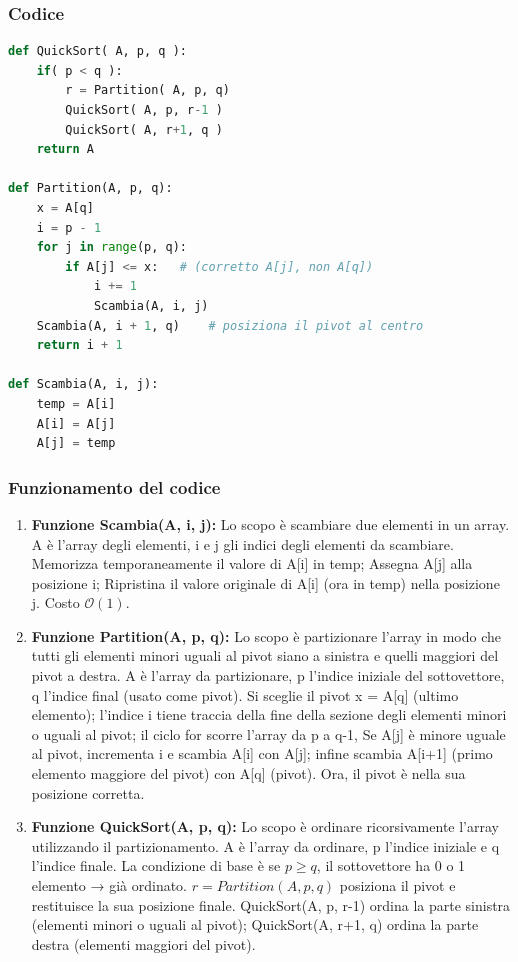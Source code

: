 \documentclass[a4paper, 11pt]{article}
\begin{document}
\subsubsection{Codice}
\begin{lstlisting}[style=mycodestyle, language=Python]
def QuickSort( A, p, q ):
    if( p < q ):
        r = Partition( A, p, q)
        QuickSort( A, p, r-1 )
        QuickSort( A, r+1, q )
    return A

def Partition(A, p, q):
    x = A[q]
    i = p - 1
    for j in range(p, q):
        if A[j] <= x:   # (corretto A[j], non A[q])
            i += 1
            Scambia(A, i, j)
    Scambia(A, i + 1, q)    # posiziona il pivot al centro
    return i + 1

def Scambia(A, i, j):
    temp = A[i]
    A[i] = A[j]
    A[j] = temp
\end{lstlisting}

\subsubsection*{Funzionamento del codice}

\begin{enumerate}
  \item \textbf{Funzione Scambia(A, i, j):} Lo scopo è scambiare due elementi in un array. A è l'array degli elementi,
   i e j gli indici degli elementi da scambiare. Memorizza temporaneamente il valore di A[i] 
   in temp; Assegna A[j] alla posizione i; Ripristina il valore originale di A[i] (ora in temp)
   nella posizione j. Costo $\mathcal{O}(1)$.

  \item \textbf{Funzione Partition(A, p, q):} Lo scopo è partizionare l'array in modo che tutti gli elementi 
   minori uguali al pivot siano a sinistra e quelli maggiori del pivot a destra. A è l'array da partizionare,
   p l'indice iniziale del sottovettore, q l'indice final (usato come pivot). Si sceglie il pivot x = A[q] (ultimo elemento);
   l'indice i tiene traccia della fine della sezione degli elementi minori o uguali al pivot; il ciclo for scorre l'array da p a q-1, 
   Se A[j] è minore uguale al pivot, incrementa i e scambia A[i] con A[j]; infine scambia A[i+1] (primo elemento maggiore del pivot) con A[q] (pivot). 
   Ora, il pivot è nella sua posizione corretta.

  \item \textbf{Funzione QuickSort(A, p, q):} Lo scopo è ordinare ricorsivamente l'array utilizzando il partizionamento. 
  A è l'array da ordinare, p l'indice iniziale e q l'indice finale. La condizione di base è se $p \geq q$, il sottovettore ha 0 o 1 elemento → già ordinato.
  $r = Partition(A, p, q)$ posiziona il pivot e restituisce la sua posizione finale. QuickSort(A, p, r-1) ordina la parte sinistra 
  (elementi minori o uguali al pivot); QuickSort(A, r+1, q) ordina la parte destra (elementi maggiori del pivot).
\end{enumerate}
\end{document}
